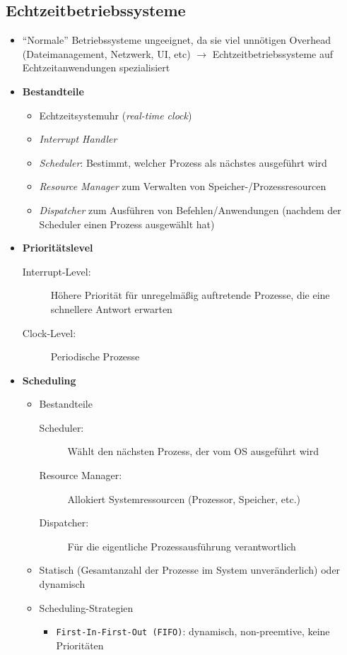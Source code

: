 \subsection{Echtzeitbetriebssysteme}
\begin{itemize}
	\item "`Normale"' Betriebssysteme ungeeignet, da sie viel unnötigen Overhead (Dateimanagement, Netzwerk, UI, etc) \(\rightarrow\) Echtzeitbetriebssysteme auf Echtzeitanwendungen spezialisiert
	\item \textbf{Bestandteile}
	\begin{itemize}
		\item Echtzeitsystemuhr (\textit{real-time clock})
		\item \textit{Interrupt Handler}
		\item \textit{Scheduler}: Bestimmt, welcher Prozess als nächstes ausgeführt wird
		\item \textit{Resource Manager} zum Verwalten von Speicher-/Prozessresourcen
		\item \textit{Dispatcher} zum Ausführen von Befehlen/Anwendungen (nachdem der Scheduler einen Prozess ausgewählt hat)
	\end{itemize}
	\item \textbf{Prioritätslevel}
	\begin{description}
		\item[Interrupt-Level:] Höhere Priorität für unregelmäßig auftretende Prozesse, die eine schnellere Antwort erwarten
		\item[Clock-Level:] Periodische Prozesse
	\end{description}
	\item \textbf{Scheduling}
	\begin{itemize}
		\item Bestandteile
		\begin{description}
			\item[Scheduler:] Wählt den nächsten Prozess, der vom OS ausgeführt wird
			\item[Resource Manager:] Allokiert Systemressourcen (Prozessor, Speicher, etc.)
			\item[Dispatcher:] Für die eigentliche Prozessausführung verantwortlich
		\end{description}
		\item Statisch (Gesamtanzahl der Prozesse im System unveränderlich) oder dynamisch
		\item Scheduling-Strategien
		\begin{itemize}
			\item \texttt{First-In-First-Out (FIFO)}: dynamisch, non-preemtive, keine Prioritäten

\end{itemize}
\end{itemize}
\end{itemize}

